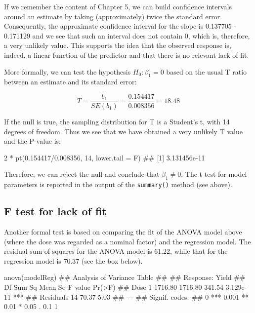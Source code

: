 \documentclass[a4paper,12pt,oneside]{book}
\newenvironment{Shaded}{\begin{snugshade}}{\end{snugshade}}
\newcommand{\DecValTok}[1]{#1}
\newcommand{\FloatTok}[1]{#1}
\newcommand{\SpecialCharTok}[1]{#1}
\newcommand{\DocumentationTok}[1]{#1}
\newcommand{\FunctionTok}[1]{#1}
\newcommand{\AttributeTok}[1]{#1}
\newcommand{\NormalTok}[1]{#1}
\begin{document}
If we remember the content of Chapter 5, we can build confidence intervals around an estimate by taking (approximately) twice the standard error. Consequently, the approximate confidence interval for the slope is 0.137705 - 0.171129 and we see that such an interval does not contain 0, which is, therefore, a very unlikely value. This supports the idea that the observed response is, indeed, a linear function of the predictor and that there is no relevant lack of fit.

More formally, we can test the hypothesis \(H_0: \beta_1 = 0\) based on the usual T ratio between an estimate and its standard error:

\[T = \frac{b_1}{SE(b_1)} = \frac{0.154417}{0.008356} = 18.48\]

If the null is true, the sampling distribution for T is a Student's t, with 14 degrees of freedom. Thus we see that we have obtained a very unlikely T value and the P-value is:

\begin{Shaded}
\begin{Highlighting}[]
\DecValTok{2} \SpecialCharTok{*} \FunctionTok{pt}\NormalTok{(}\FloatTok{0.154417}\SpecialCharTok{/}\FloatTok{0.008356}\NormalTok{, }\DecValTok{14}\NormalTok{, }\AttributeTok{lower.tail =}\NormalTok{ F)}
\DocumentationTok{\#\# [1] 3.131456e{-}11}
\end{Highlighting}
\end{Shaded}

Therefore, we can reject the null and conclude that \(\beta_1 \ne 0\). The t-test for model parameters is reported in the output of the \texttt{summary()} method (see above).

\hypertarget{f-test-for-lack-of-fit}{%
\subsection{F test for lack of fit}\label{f-test-for-lack-of-fit}}

Another formal test is based on comparing the fit of the ANOVA model above (where the dose was regarded as a nominal factor) and the regression model. The residual sum of squares for the ANOVA model is 61.22, while that for the regression model is 70.37 (see the box below).

\begin{Shaded}
\begin{Highlighting}[]
\FunctionTok{anova}\NormalTok{(modelReg)}
\DocumentationTok{\#\# Analysis of Variance Table}
\DocumentationTok{\#\# }
\DocumentationTok{\#\# Response: Yield}
\DocumentationTok{\#\#           Df  Sum Sq Mean Sq F value    Pr(\textgreater{}F)    }
\DocumentationTok{\#\# Dose       1 1716.80 1716.80  341.54 3.129e{-}11 ***}
\DocumentationTok{\#\# Residuals 14   70.37    5.03                      }
\DocumentationTok{\#\# {-}{-}{-}}
\DocumentationTok{\#\# Signif. codes:  }
\DocumentationTok{\#\# 0 \textquotesingle{}***\textquotesingle{} 0.001 \textquotesingle{}**\textquotesingle{} 0.01 \textquotesingle{}*\textquotesingle{} 0.05 \textquotesingle{}.\textquotesingle{} 0.1 \textquotesingle{} \textquotesingle{} 1}
\end{Highlighting}
\end{Shaded}
\end{document}
